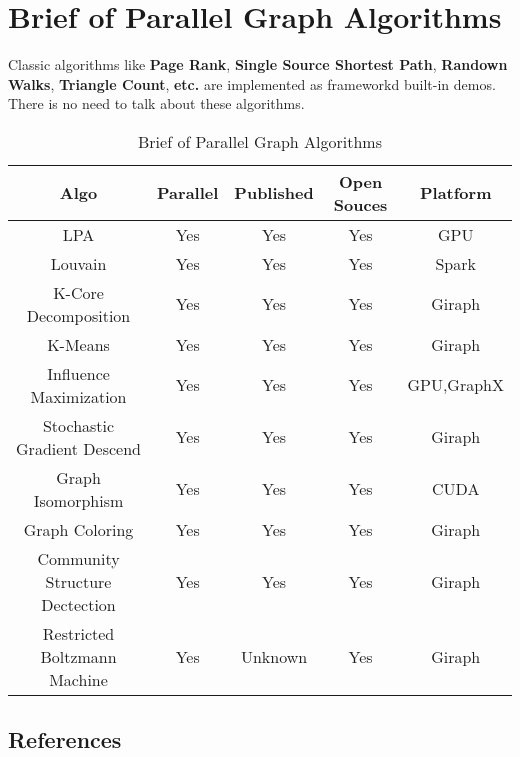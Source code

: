 \documentclass{article}
\begin{document}
	\section{Brief of Parallel Graph Algorithms}
	Classic algorithms like \textbf{Page Rank}, \textbf{Single Source Shortest Path}, \textbf{Randown Walks}, \textbf{Triangle Count}, \textbf{etc.} are implemented as frameworkd built-in demos. There is no need to talk about these algorithms.
	\begin{table}[!bhp]
	\begin{tabular}{|c|c|c|c|c|}
	\hline
	Algo 						& 	Parallel 	& 	Published	& 	Open Souces	&	Platform	\\
	\hline
	LPA							&	Yes			&	Yes			& 	Yes			&	GPU			\\
	\hline
	Louvain						&	Yes			&	Yes			&	Yes			&	Spark		\\
	\hline
	K-Core Decomposition		& 	Yes			&	Yes			&	Yes			&	Giraph		\\
	\hline
	K-Means						&	Yes			&	Yes			&	Yes			&	Giraph 		\\
	\hline
	Influence Maximization		&	Yes			&	Yes			&	Yes			&	GPU,GraphX	\\
	\hline
	Stochastic Gradient Descend	&	Yes			&	Yes			&	Yes			&	Giraph 		\\
	\hline
	Graph Isomorphism			&	Yes			&	Yes			&	Yes			& 	CUDA		\\
	\hline
	Graph Coloring				&	Yes			&	Yes			& 	Yes			&	Giraph 		\\
	\hline
	Community Structure Dectection	& 	Yes		&	Yes			&	Yes			&	Giraph 		\\
	\hline
	Restricted Boltzmann Machine	& 	Yes		&	Unknown		&	Yes			&	Giraph 		\\
	\hline

	\end{tabular}
	\caption{Brief of Parallel Graph Algorithms}
	\end{table}

	\begin{appendix}
		\section{References}
	\end{appendix}
\end{document}
